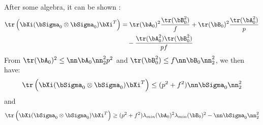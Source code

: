 \begin{IEEEproof}
After some algebra, it can be shown \cite{TsiligkaridisTSP}:
\begin{align}
	\tr\left( \bXi (\bSigma_0\otimes \bSigma_0) \bXi^T\right) &= \tr(\bA_0)^2 \frac{\tr(\bB_0^2)}{f} + \tr(\bB_0)^2 \frac{\tr(\bA_0^2)}{p} \nonumber \\
		&\quad - \frac{\tr(\bA_0^2)\tr(\bB_0^2)}{pf} \label{eval_1}
\end{align}
From $\tr(\bA_0)^2 \leq \nn \bA_0 \nn_2^2 p^2$ and $\tr(\bB_0^2) \leq f \nn\bB_0 \nn_2^2$, we then have:
\begin{equation} \label{upper_bound_trace}
	\tr\left( \bXi (\bSigma_0\otimes \bSigma_0) \bXi^T\right) \leq (p^2+f^2) \nn \bSigma_0\nn_2^2
\end{equation}
and
\begin{equation} \label{lower_bound_trace}
	\tr\left( \bXi (\bSigma_0\otimes \bSigma_0) \bXi^T\right) \geq (p^2+f^2) \lambda_{min}(\bA_0)^2 \lambda_{min}(\bB_0)^2 - \nn \bSigma_0\nn_2^2
\end{equation}
%

\end{IEEEproof}
